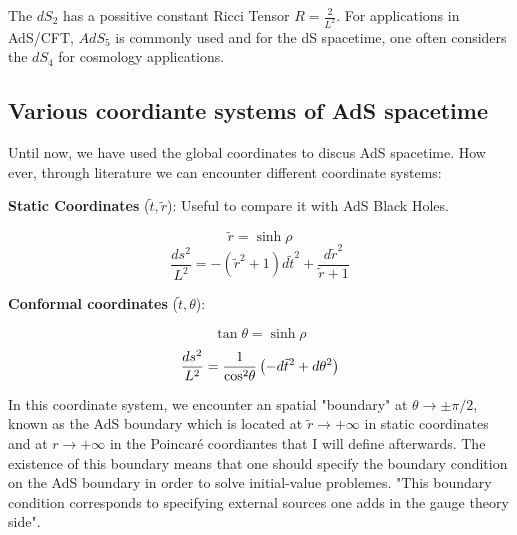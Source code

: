\documentclass[12pt]{article}
\begin{document}
\vspace{0.5cm}

The \( dS_2 \) has a possitive constant Ricci Tensor \(R = \frac{2}{L^2}\). For applications in AdS/CFT, \( AdS_5 \) is commonly used and for the dS spacetime, one often considers the \( dS_4 \) for cosmology applications.

\subsection{Various coordiante systems of AdS spacetime}

Until now, we have used the global coordinates to discus AdS spacetime. How ever, through literature we can encounter different coordinate systems:

\vspace{0.5cm}

\textbf{Static Coordinates} (\( \tilde{t}, \tilde{r} \)): Useful to compare it with AdS Black Holes.

\begin{equation}
    \tilde{r} = \sinh{ \rho }
\end{equation}
\begin{equation}
    \frac{ds^2}{L^2} = -(\tilde{r}^2 + 1)d\tilde{t}^2 + \frac{d\tilde{r}^2}{\tilde{r} + 1}
\end{equation}

\textbf{Conformal coordinates} (\( \tilde{t}, \theta \)):

\begin{equation}
    \tan{ \theta } = \sinh{ \rho }
\end{equation}
\begin{equation}
    \frac{ds^2}{L^2} = \frac{ 1 }{ \cos^2{ \hspace{-2pt}\theta } }\left(-d\tilde{t}^2+d\theta^2\right)
\end{equation}

In this coordinate system, we encounter an spatial "boundary" at \( \theta \rightarrow \pm \pi/2 \), known as the AdS boundary which is located at \( \tilde{ r } \rightarrow +\infty \) in static coordinates and at \( r \rightarrow +\infty \) in the Poincaré coordiantes that I will define afterwards. The existence of this boundary means that one should specify the boundary condition on the AdS boundary in order to solve initial-value problemes. "This boundary condition corresponds to specifying external sources one adds in the gauge theory side".
\end{document}
